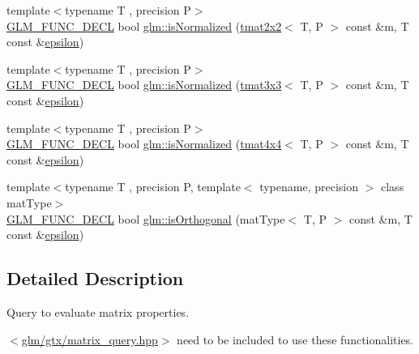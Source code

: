\begin{DoxyCompactItemize}
\item 
{\footnotesize template$<$typename T , precision P$>$ }\\\mbox{\hyperlink{setup_8hpp_ab2d052de21a70539923e9bcbf6e83a51}{G\+L\+M\+\_\+\+F\+U\+N\+C\+\_\+\+D\+E\+CL}} bool \mbox{\hyperlink{group__gtx__matrix__query_ga11a8d5cdb36496b85f61e4f5f7f2602c}{glm\+::is\+Normalized}} (\mbox{\hyperlink{structglm_1_1tmat2x2}{tmat2x2}}$<$ T, P $>$ const \&m, T const \&\mbox{\hyperlink{group__gtc__constants_ga2a1e57fc5592b69cfae84174cbfc9429}{epsilon}})
\item 
{\footnotesize template$<$typename T , precision P$>$ }\\\mbox{\hyperlink{setup_8hpp_ab2d052de21a70539923e9bcbf6e83a51}{G\+L\+M\+\_\+\+F\+U\+N\+C\+\_\+\+D\+E\+CL}} bool \mbox{\hyperlink{group__gtx__matrix__query_ga351bcc8d485d329b78cfa875e084964d}{glm\+::is\+Normalized}} (\mbox{\hyperlink{structglm_1_1tmat3x3}{tmat3x3}}$<$ T, P $>$ const \&m, T const \&\mbox{\hyperlink{group__gtc__constants_ga2a1e57fc5592b69cfae84174cbfc9429}{epsilon}})
\item 
{\footnotesize template$<$typename T , precision P$>$ }\\\mbox{\hyperlink{setup_8hpp_ab2d052de21a70539923e9bcbf6e83a51}{G\+L\+M\+\_\+\+F\+U\+N\+C\+\_\+\+D\+E\+CL}} bool \mbox{\hyperlink{group__gtx__matrix__query_ga934b673ec0e16d79eca0ca9dbb5d6d8b}{glm\+::is\+Normalized}} (\mbox{\hyperlink{structglm_1_1tmat4x4}{tmat4x4}}$<$ T, P $>$ const \&m, T const \&\mbox{\hyperlink{group__gtc__constants_ga2a1e57fc5592b69cfae84174cbfc9429}{epsilon}})
\item 
{\footnotesize template$<$typename T , precision P, template$<$ typename, precision $>$ class mat\+Type$>$ }\\\mbox{\hyperlink{setup_8hpp_ab2d052de21a70539923e9bcbf6e83a51}{G\+L\+M\+\_\+\+F\+U\+N\+C\+\_\+\+D\+E\+CL}} bool \mbox{\hyperlink{group__gtx__matrix__query_gab2cb5d23df77b4e4e63ad2965acd31b3}{glm\+::is\+Orthogonal}} (mat\+Type$<$ T, P $>$ const \&m, T const \&\mbox{\hyperlink{group__gtc__constants_ga2a1e57fc5592b69cfae84174cbfc9429}{epsilon}})
\end{DoxyCompactItemize}


\subsection{Detailed Description}
Query to evaluate matrix properties. 

$<$\mbox{\hyperlink{matrix__query_8hpp}{glm/gtx/matrix\+\_\+query.\+hpp}}$>$ need to be included to use these functionalities. 

